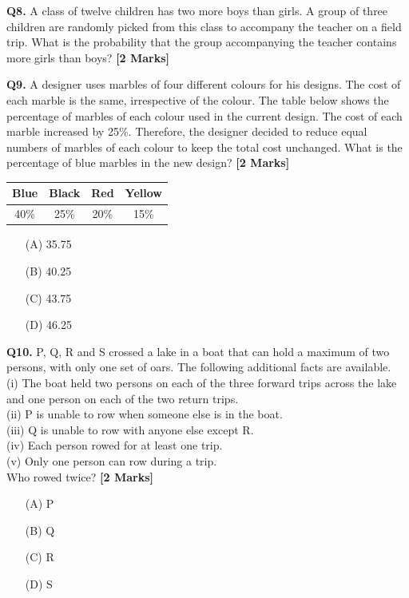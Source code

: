\documentclass[11pt]{article}
\newcommand{\questionb}[2]{
    \noindent\textbf{Q#2.} #1 \hfill \textbf{[2 Marks]}
}
\begin{document}
\questionb{A class of twelve children has two more boys than girls. A group of three children are randomly picked from this class to accompany the teacher on a field trip. What is the probability that the group accompanying the teacher contains more girls than boys?}{8}
\vspace{0.5cm}

\questionb{A designer uses marbles of four different colours for his designs. The cost of each marble is the same, irrespective of the colour. The table below shows the percentage of marbles of each colour used in the current design. The cost of each marble increased by 25\%. Therefore, the designer decided to reduce equal numbers of marbles of each colour to keep the total cost unchanged. What is the percentage of blue marbles in the new design?}{9}
\begin{center}
\begin{tabular}{|c|c|c|c|}
\hline
Blue & Black & Red & Yellow \\
\hline
40\% & 25\% & 20\% & 15\% \\
\hline
\end{tabular}
\end{center}
\begin{enumerate}
    \item[(A)] 35.75
    \item[(B)] 40.25
    \item[(C)] 43.75
    \item[(D)] 46.25
\end{enumerate}
\vspace{0.5cm}

\questionb{P, Q, R and S crossed a lake in a boat that can hold a maximum of two persons, with only one set of oars. The following additional facts are available. \\
(i) The boat held two persons on each of the three forward trips across the lake and one person on each of the two return trips. \\
(ii) P is unable to row when someone else is in the boat. \\
(iii) Q is unable to row with anyone else except R. \\
(iv) Each person rowed for at least one trip. \\
(v) Only one person can row during a trip. \\
Who rowed twice?}{10}
\begin{enumerate}
    \item[(A)] P
    \item[(B)] Q
    \item[(C)] R
    \item[(D)] S
\end{enumerate}
\vspace{0.5cm}
\end{document}
